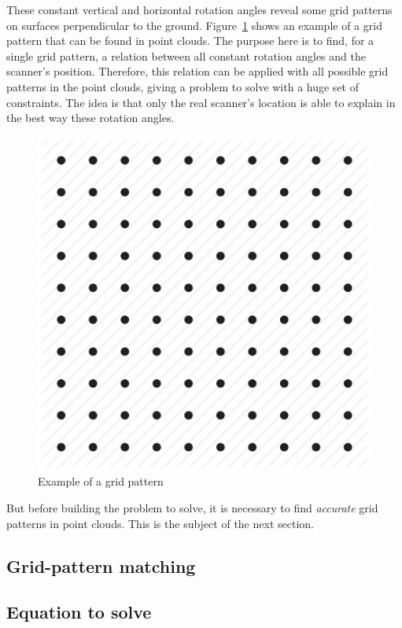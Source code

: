 These constant vertical and horizontal rotation angles reveal some grid patterns on surfaces perpendicular to the ground. Figure~\ref{fig:grid1} shows an example of a grid pattern that can be found in point clouds. The purpose here is to find, for a single grid pattern, a relation between all constant rotation angles and the scanner's position. Therefore, this relation can be applied with all possible grid patterns in the point clouds, giving a problem to solve with a huge set of
constraints. The idea is that only the real scanner's location is able to
explain in the best way these rotation angles.

\begin{figure}[H]
 \centering
 \includegraphics[scale=0.4]{img/grid1.png}
  \caption{Example of a grid pattern}
 \label{fig:grid1}
\end{figure}

But before building the problem to solve, it is necessary to find \emph{accurate} grid patterns in point clouds. This is the subject of the next section.


\subsection{Grid-pattern matching}


\subsection{Equation to solve}


